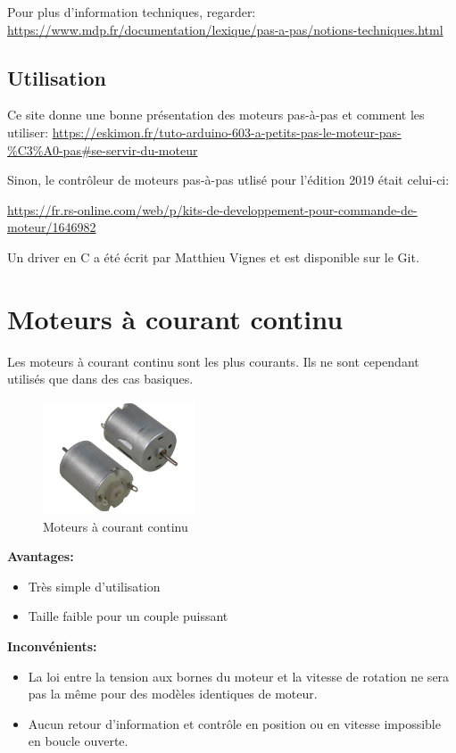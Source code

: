 \documentclass[a4paper, 11pt]{report}
\begin{document}
Pour plus d'information techniques, regarder: \url{https://www.mdp.fr/documentation/lexique/pas-a-pas/notions-techniques.html}

\subsection{Utilisation}

Ce site donne une bonne présentation des moteurs pas-à-pas et comment les utiliser: \url{https://eskimon.fr/tuto-arduino-603-a-petits-pas-le-moteur-pas-\%C3\%A0-pas#se-servir-du-moteur}

Sinon, le contrôleur de moteurs pas-à-pas utlisé pour l'édition 2019 était celui-ci:

\url{https://fr.rs-online.com/web/p/kits-de-developpement-pour-commande-de-moteur/1646982}

Un driver en C a été écrit par Matthieu Vignes et est disponible sur le Git.

\section{Moteurs à courant continu}

Les moteurs à courant continu sont les plus courants. Ils ne sont cependant utilisés que dans des cas basiques.

\begin{figure}[h!]
\begin{centering}
\includegraphics[width=0.4\textwidth]{images/MoteurDC.jpeg}
\caption{Moteurs à courant continu}
\par\end{centering}
\end{figure}

\textbf{Avantages:}
\begin{itemize}
\item Très simple d'utilisation
\item Taille faible pour un couple puissant
\end{itemize}

\textbf{Inconvénients:}
\begin{itemize}
\item La loi entre la tension aux bornes du moteur et la vitesse de rotation ne sera pas la même pour des modèles identiques de moteur.
\item Aucun retour d'information et contrôle en position ou en vitesse impossible en boucle ouverte.
\end{itemize}
\end{document}
